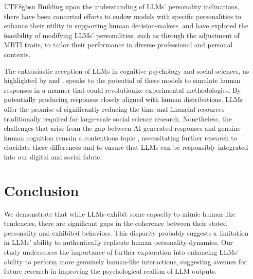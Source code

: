 \documentclass{article}
\theoremstyle{plain}
\theoremstyle{definition}
\theoremstyle{remark}
\begin{document}
\begin{CJK*}{UTF8}{gbsn}
Building upon the understanding of LLMs' personality inclinations, there have been concerted efforts to endow models with specific personalities to enhance their utility in supporting human decision-makers. \citet{jiang2023personallm} and \citet{cui2023machine} have explored the feasibility of modifying LLMs' personalities, such as through the adjustment of MBTI traits, to tailor their performance in diverse professional and personal contexts.

The enthusiastic reception of LLMs in cognitive psychology and social sciences, as highlighted by \citet{dillion2023can} and \citet{harding2023ai}, speaks to the potential of these models to simulate human responses in a manner that could revolutionize experimental methodologies. By potentially producing responses closely aligned with human distributions, LLMs offer the promise of significantly reducing the time and financial resources traditionally required for large-scale social science research. Nonetheless, the challenges that arise from the gap between AI-generated responses and genuine human cognition remain a contentious topic \citep{harding2023ai}, necessitating further research to elucidate these differences and to ensure that LLMs can be responsibly integrated into our digital and social fabric.
\fi

\section{Conclusion} \label{sec-con}
We demonstrate that while LLMs exhibit some capacity to mimic human-like tendencies, there are significant gaps in the coherence between their stated personality and exhibited behaviors. This disparity probably suggests a limitation in LLMs' ability to authentically replicate human personality dynamics. Our study underscores the importance of further exploration into enhancing LLMs' ability to perform more genuinely human-like interactions, suggesting avenues for future research in improving the psychological realism of LLM outputs.



\end{CJK*}
\end{document}
